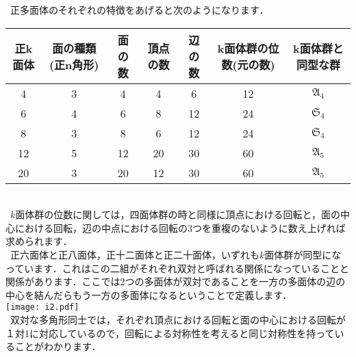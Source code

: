 \documentclass{jreport}
\theoremstyle{idefinition}
\begin{document}
\ 正多面体のそれぞれの特徴をあげると次のようになります．\\


\begin{tabular}{|c||c|c|c|c|c|c|}\hline
正k面体 & 面の種類(正n角形) & 面の数 & 頂点の数 & 辺の数 & k面体群の位数(元の数) & k面体群と同型な群\\\hline
4 & 3 & 4 & 4 & 6 & 12 & $\mathfrak{A}_4$\\\hline 
6 & 4 & 6 & 8 & 12 & 24 & $\mathfrak{S}_4$\\\hline 
8 & 3 & 8 & 6 & 12 & 24 & $\mathfrak{S}_4$\\\hline 
12 & 5 & 12 & 20 & 30 & 60 & $\mathfrak{A}_5$\\\hline 
20 & 3 & 20 & 12 & 30 & 60 & $\mathfrak{A}_5$\\\hline 
\end{tabular}\\

\ $k$面体群の位数に関しては，四面体群の時と同様に頂点における回転と，面の中心における回転，辺の中点における回転の$3$つを重複のないように数え上げれば求められます．\\
\ 正六面体と正八面体，正十二面体と正二十面体，いずれも$k$面体群が同型になっています．これはこの二組がそれぞれ双対と呼ばれる関係になっていることと関係があります．ここでは2つの多面体が双対であることを一方の多面体の辺の中心を結んだらもう一方の多面体になるということで定義します．\\
\texttt{[image: i2.pdf]}\\
\ 双対な多角形同士では，それぞれ頂点における回転と面の中心における回転が１対1に対応しているので，回転による対称性を考えると同じ対称性を持っていることがわかります．\\
\end{document}

